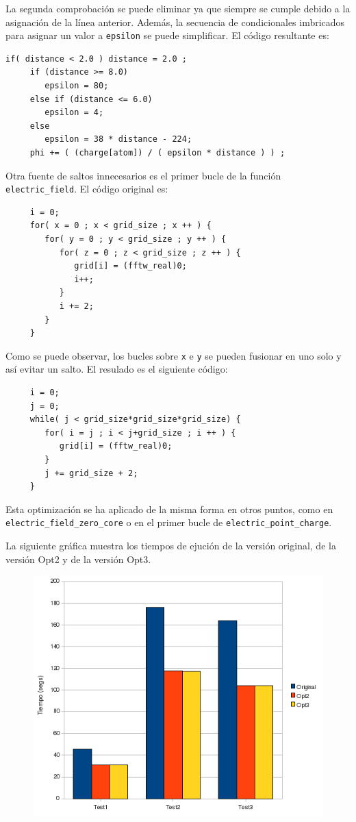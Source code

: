 La segunda comprobaci\'{o}n se puede eliminar ya que siempre se cumple debido a
la asignaci\'{o}n de la l\'{i}nea anterior. Adem\'{a}s, la secuencia de
condicionales imbricados para asignar un valor a \texttt{epsilon} se puede
simplificar. El c\'{o}digo resultante es:

\begin{lstlisting}[]
     if( distance < 2.0 ) distance = 2.0 ;
     if (distance >= 8.0)
        epsilon = 80;
     else if (distance <= 6.0)
        epsilon = 4;
     else
        epsilon = 38 * distance - 224;
     phi += ( (charge[atom]) / ( epsilon * distance ) ) ;
\end{lstlisting}

Otra fuente de saltos innecesarios es el primer bucle de la funci\'{o}n
\texttt{electric\_field}. El c\'{o}digo original es:

\begin{lstlisting}
     i = 0;
     for( x = 0 ; x < grid_size ; x ++ ) {
        for( y = 0 ; y < grid_size ; y ++ ) {
           for( z = 0 ; z < grid_size ; z ++ ) {
              grid[i] = (fftw_real)0;
              i++;
           }
           i += 2;
        }
     }
\end{lstlisting}

Como se puede observar, los bucles sobre \texttt{x} e \texttt{y} se pueden
fusionar en uno solo y as\'{i} evitar un salto. El resulado es el siguiente
c\'{o}digo:

\begin{lstlisting}
     i = 0; 
     j = 0;
     while( j < grid_size*grid_size*grid_size) {
        for( i = j ; i < j+grid_size ; i ++ ) {
           grid[i] = (fftw_real)0;
        }
        j += grid_size + 2;
     }
\end{lstlisting}

Esta optimizaci\'{o}n se ha aplicado de la misma forma en otros puntos, como en
\texttt{electric\_field\_zero\_core} o en el primer bucle de
\texttt{electric\_point\_charge}.

La siguiente gr\'{a}fica muestra los tiempos de ejuci\'{o}n de la versi\'{o}n
original, de la versi\'{o}n Opt2 y de la versi\'{o}n Opt3.

\begin{figure}[ht]
   \centering
   \includegraphics[keepaspectratio=true,width=.5\textwidth]{figures/opt3-perf}
\end{figure}

